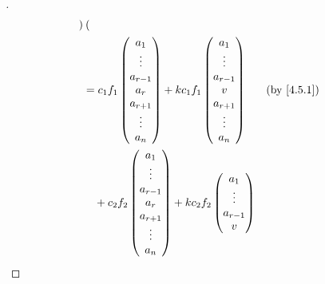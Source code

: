 \begin{proof}[]
\begin{align*}
\begin{pmatrix}
		                                                                    \end{pmatrix}   \\
		 & = c_1 f_1\begin{pmatrix}
			            a_1       \\
			            \vdots    \\
			            a_{r - 1} \\
			            a_r       \\
			            a_{r + 1} \\
			            \vdots    \\
			            a_n
		            \end{pmatrix} + k c_1 f_1\begin{pmatrix}
			                                     a_1       \\
			                                     \vdots    \\
			                                     a_{r - 1} \\
			                                     v         \\
			                                     a_{r + 1} \\
			                                     \vdots    \\
			                                     a_n
		                                     \end{pmatrix}             &  & \by{4.5.1}       \\
		 & \quad + c_2 f_2\begin{pmatrix}
			                  a_1       \\
			                  \vdots    \\
			                  a_{r - 1} \\
			                  a_r       \\
			                  a_{r + 1} \\
			                  \vdots    \\
			                  a_n
		                  \end{pmatrix} + k c_2 f_2\begin{pmatrix}
			                                           a_1       \\
			                                           \vdots    \\
			                                           a_{r - 1} \\
			                                           v         \\

\end{pmatrix}
\end{align*}
\end{proof}
